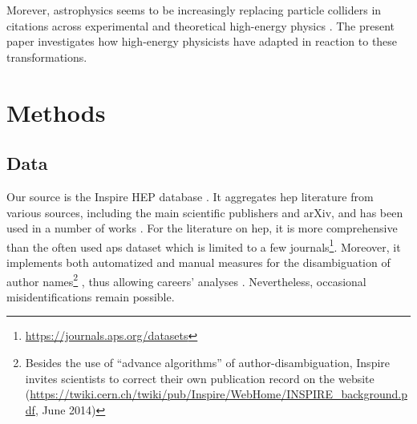 \documentclass{article}
\begin{document}
Morever, astrophysics seems to be increasingly replacing particle colliders in citations across experimental and theoretical high-energy physics \citep{Gautheron2023}. %
The present paper investigates how high-energy physicists have adapted in reaction to these transformations. %

\section{\label{sec:methods}Methods}

\subsection{\label{sec:data}Data}

Our source is the Inspire HEP database \citep{InspireAPI}. It aggregates \gls{hep} literature from various sources, including the main scientific publishers and arXiv, and has been used in a number of works \citep{Gautheron2023,Perovi2016,Chall2019a,Strumia2021,Sikimi2022}. For the literature on \gls{hep}, it is more comprehensive than the often used \gls{aps} dataset which is limited to a few journals\footnote{\url{https://journals.aps.org/datasets}}. %
Moreover, it implements both automatized and manual measures for the disambiguation of author names\footnote{Besides the use of ``advance algorithms'' of author-disambiguation, Inspire invites scientists to correct their own publication record on the website (\url{https://twiki.cern.ch/twiki/pub/Inspire/WebHome/INSPIRE_background.pdf}, June 2014)} %
, thus allowing careers' analyses \citep{Strumia2021}. Nevertheless, occasional misidentifications remain possible. %
\end{document}
